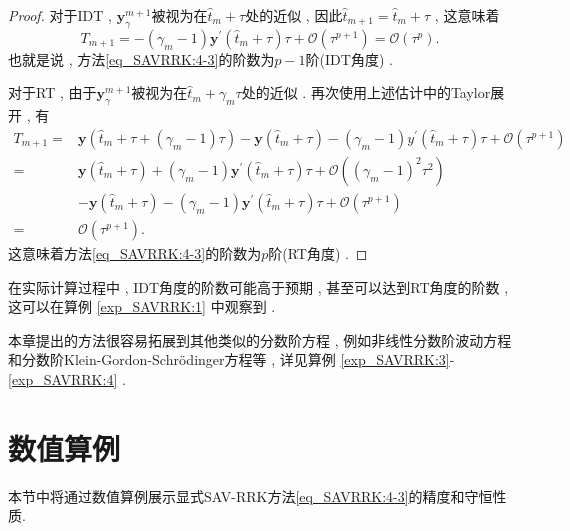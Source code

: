 \begin{proof}
对于IDT , $\bm{y}_\gamma^{m+1}$被视为在$\hat{t}_m+\tau$处的近似 , 因此$\hat{t}_{m+1}=\hat{t}_m+\tau$ , 这意味着
$$T_{m+1}=-\left(\gamma_m-1\right) \bm{y}^{\prime}\left(\hat{t}_m+\tau\right) \tau+\mathcal{O}\left(\tau^{p+1}\right)=\mathcal{O}\left(\tau^p\right) . $$
也就是说 , 方法\eqref{eq_SAVRRK:4-3}的阶数为$p-1$阶(IDT角度) . 

对于RT , 由于$\bm{y}_\gamma^{m+1}$被视为在$\hat{t}_m+\gamma_m \tau$处的近似 . 再次使用上述估计中的Taylor展开 , 有
\begin{align}
T_{m+1}\!= & \bm{y}\left(\hat{t}_m\!+\!\tau\!+\!\left(\gamma_m\!-\!1\right) \tau\right)\!-\!\bm{y}\left(\hat{t}_m\!+\!\tau\right)\!-\!\left(\gamma_m\!-\!1\right) y^{\prime}\left(\hat{t}_m\!+\!\tau\right) \tau\!+\!\mathcal{O}(\tau^{p+1}) \nonumber\\
\!= & \bm{y}\left(\hat{t}_m\!+\!\tau\right)\!+\!\left(\gamma_m\!-\!1\right) \bm{y}^{\prime}\left(\hat{t}_m\!+\!\tau\right) \tau\!+\!\mathcal{O}(\left(\gamma_m\!-\!1\right)^2 \tau^2)\!\nonumber\\
&-\!\bm{y}\left(\hat{t}_m\!+\!\tau\right)\!-\!\left(\gamma_m\!-\!1\right) \bm{y}^{\prime}\left(\hat{t}_m\!+\!\tau\right) \tau\!+\!\mathcal{O}(\tau^{p+1}) \nonumber\\
\!= & \mathcal{O}(\tau^{p+1}) . 
\end{align}
这意味着方法\eqref{eq_SAVRRK:4-3}的阶数为$p$阶(RT角度) . 

\end{proof}

\begin{remark}\label{rk_SAVRRK:5_5}
在实际计算过程中 , IDT角度的阶数可能高于预期 , 甚至可以达到RT角度的阶数 , 这可以在算例 \ref{exp_SAVRRK:1} 中观察到 . 
\end{remark}
	
\begin{remark}\label{rk_SAVRRK:5_6}
本章提出的方法很容易拓展到其他类似的分数阶方程 , 例如非线性分数阶波动方程和分数阶Klein-Gordon-Schr{\"o}dinger方程等 , 详见算例 \ref{exp_SAVRRK:3}-\ref{exp_SAVRRK:4}  . 
\end{remark}

\section{数值算例}\label{Section_SAVRRK: 6}

本节中将通过数值算例展示显式SAV-RRK方法\eqref{eq_SAVRRK:4-3}的精度和守恒性质.


